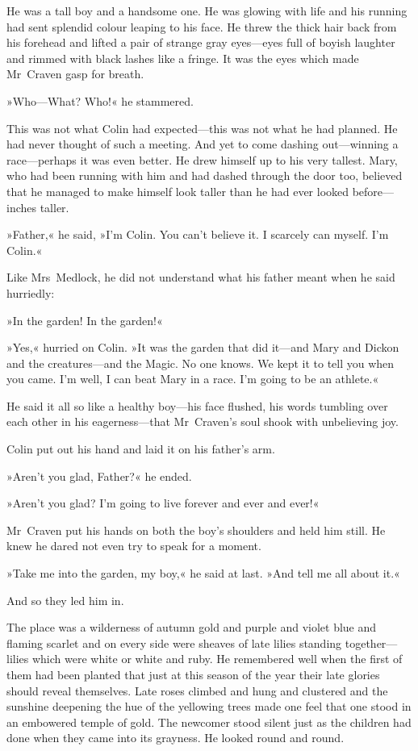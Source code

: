 He was a tall boy and a handsome one. He was glowing with life and his running had sent splendid colour leaping to his face. He threw the thick hair back from his forehead and lifted a pair of strange gray eyes—eyes full of boyish laughter and rimmed with black lashes like a fringe. It was the eyes which made Mr~Craven gasp for breath.

»Who—What? Who!« he stammered.

This was not what Colin had expected—this was not what he had planned. He had never thought of such a meeting. And yet to come dashing out—winning a race—perhaps it was even better. He drew himself up to his very tallest. Mary, who had been running with him and had dashed through the door too, believed that he managed to make himself look taller than he had ever looked before—inches taller.

»Father,« he said, »I'm Colin. You can't believe it. I scarcely can myself. I'm Colin.«

Like Mrs~Medlock, he did not understand what his father meant when he said hurriedly:

»In the garden! In the garden!«

»Yes,« hurried on Colin. »It was the garden that did it—and Mary and Dickon and the creatures—and the Magic. No one knows. We kept it to tell you when you came. I'm well, I can beat Mary in a race. I'm going to be an athlete.«

He said it all so like a healthy boy—his face flushed, his words tumbling over each other in his eagerness—that Mr~Craven's soul shook with unbelieving joy.

Colin put out his hand and laid it on his father's arm.

»Aren't you glad, Father?« he ended.

»Aren't you glad? I'm going to live forever and ever and ever!«

Mr~Craven put his hands on both the boy's shoulders and held him still. He knew he dared not even try to speak for a moment.

»Take me into the garden, my boy,« he said at last. »And tell me all about it.«

And so they led him in.

The place was a wilderness of autumn gold and purple and violet blue and flaming scarlet and on every side were sheaves of late lilies standing together—lilies which were white or white and ruby. He remembered well when the first of them had been planted that just at this season of the year their late glories should reveal themselves. Late roses climbed and hung and clustered and the sunshine deepening the hue of the yellowing trees made one feel that one stood in an embowered temple of gold. The newcomer stood silent just as the children had done when they came into its grayness. He looked round and round.

